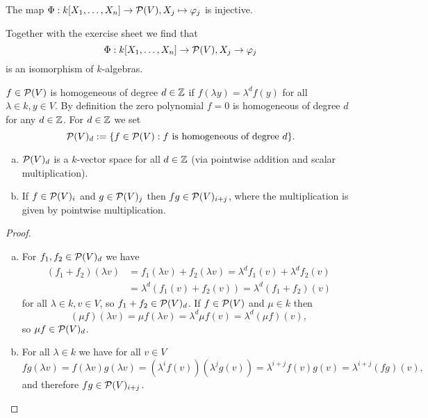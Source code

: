 \begin{cor}
 The map $\Phi : k[X_1, \ldots, X_n] \to \mathcal{P}(V), X_j \mapsto \varphi_j$ is injective.
\end{cor}


Together with the exercise sheet we find that
\[
 \Phi : k[X_1, \ldots, X_n] \to \mathcal{P}(V), X_j \to \varphi_j
\]
is an isomorphism of $k$-algebras.


\begin{defi}
 $f \in \mathcal{P}(V)$ is homogeneous of degree $d \in \mathbb{Z}$ if $f(\lambda y) = \lambda^d f(y)$ for all $\lambda \in k, y \in V$. By definition the zero polynomial $f=0$ is homogeneous of degree $d$ for any $d \in \mathbb{Z}$. For $d \in \mathbb{Z}$ we set
 \[
  \mathcal{P}(V)_d := \{f \in \mathcal{P}(V) : f \text{ is homogeneous of degree } d\}.
 \]
\end{defi}


\begin{lem}\leavevmode
 \begin{enumerate}[a)]
  \item
   $\mathcal{P}(V)_d$ is a $k$-vector space for all $d \in \mathbb{Z}$ (via pointwise addition and scalar multiplication).
  \item
   If $f \in \mathcal{P}(V)_i$ and $g \in \mathcal{P}(V)_j$  then $fg \in \mathcal{P}(V)_{i+j}$, where the multiplication is given by pointwise multiplication.
 \end{enumerate}
\end{lem}
\begin{proof}\leavevmode
 \begin{enumerate}[a)]
  \item For $f_1, f_2 \in \mathcal{P}(V)_d$ we have
  \begin{align*}
   (f_1+f_2)(\lambda v)
   &= f_1(\lambda v) + f_2(\lambda v)
   = \lambda^d f_1(v) + \lambda^d f_2(v) \\
   &= \lambda^d (f_1(v) + f_2(v))
   = \lambda^d (f_1 + f_2)(v)
  \end{align*}
  for all $\lambda \in k, v \in V$, so $f_1 + f_2 \in \mathcal{P}(V)_d$. If $f \in \mathcal{P}(V)$ and $\mu \in k$ then
  \[
   (\mu f)(\lambda v) = \mu f(\lambda v) = \lambda^d \mu f(v) = \lambda^d (\mu f)(v),
  \]
  so $\mu f \in \mathcal{P}(V)_d$.
  \item
  For all $\lambda \in k$ we have for all $v \in V$
  \[
   fg(\lambda v)
   = f(\lambda v) g(\lambda v)
   = \left(\lambda^i f(v)\right)\left(\lambda^j g(v)\right)
   = \lambda^{i+j} f(v) g(v)
   = \lambda^{i+j} (fg)(v),
  \]
  and therefore $fg \in \mathcal{P}(V)_{i+j}$. \qedhere
 \end{enumerate}
\end{proof}


